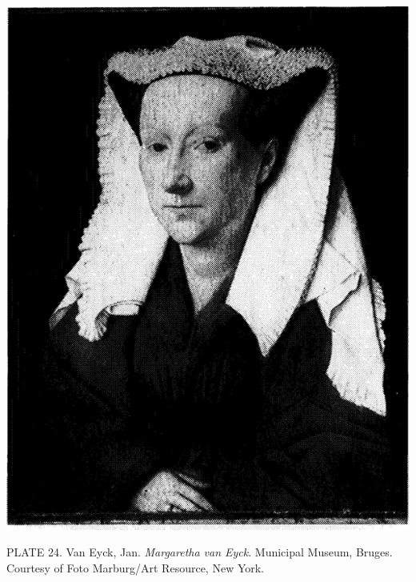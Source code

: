 \protect\hypertarget{20_ILLUSTRATIONS_FOLLOW_PAGE.xhtmlux5cux23id_23}{}{}\includegraphics{include/html/images/343_1.png}

PLATE 24. Van Eyck, Jan. \emph{Margaretha van Eyck}. Municipal Museum,
Bruges. Courtesy of Foto Marburg/Art Resource, New York.

